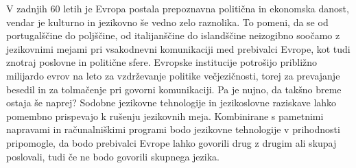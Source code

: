\begin{multicols}{2}

V zadnjih 60 letih je Evropa postala prepoznavna politična in ekonomska danost, vendar je kulturno in jezikovno še vedno zelo raznolika. To po\-meni, da se od portugalščine do poljščine, od itali\-janščine do islandščine neizogibno soočamo z jezikovnimi mejami pri vsakodnevni komunikaciji med prebivalci Evrope, kot tudi znotraj poslovne in politične sfere. Evropske institucije potrošijo približno mili\-jardo evrov na leto za vzdrževanje politike večjezičnosti, torej za prevajanje besedil in za tolmačenje pri go\-vorni komunikaciji. Pa je nujno, da takšno breme ostaja še naprej? Sodobne jezikovne tehnologije in jezikoslovne raziskave lahko pomembno prispevajo k rušenju jezikovnih meja. Kombinirane s pametnimi napravami in računalniškimi programi bodo jezikovne tehnologije v prihodnosti pripomogle, da bodo prebivalci Evrope lahko go\-vorili drug z drugim ali skupaj poslovali, tudi če ne bodo go\-vorili skupnega jezika.



\end{multicols}
